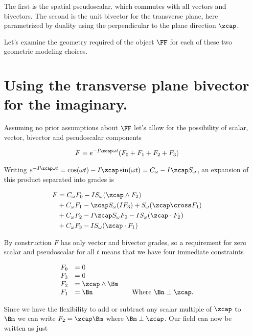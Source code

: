 The first is the spatial pseudoscalar, which commutes with all vectors and bivectors.  The second is the unit bivector for the transverse plane, here parametrized by duality using the perpendicular to the plane direction $\zcap$.

Let's examine the geometry required of the object $\FF$ for each of these two geometric modeling choices.

\section{Using the transverse plane bivector for the imaginary.}

Assuming no prior assumptions about $\FF$ let's allow for the possibility of scalar, vector, bivector and pseudoscalar components 

\begin{align}\label{eqn:foo5}
F = e^{-I\zcap \omega t} ( F_0 + F_1 + F_2 + F_3 )
\end{align}

Writing $e^{-I\zcap \omega t} = \cos(\omega t) -I \zcap \sin(\omega t) = C_\omega -I \zcap S_\omega$, an expansion of this product separated into grades is

\begin{align*}
F &= 
  C_\omega F_0 - I S_\omega (\zcap \wedge F_2) \\
&+ C_\omega F_1 - \zcap S_\omega (I F_3) + S_\omega (\zcap \cross F_1)  \\
&+ C_\omega F_2 - I \zcap S_\omega F_0 - I S_\omega (\zcap \cdot F_2) \\
&+ C_\omega F_3 - I S_\omega (\zcap \cdot F_1)
\end{align*}

By construction $F$ has only vector and bivector grades, so a requirement for zero scalar and pseudoscalar for all $t$ means that we have four immediate constraints

\begin{align*}
\begin{array}{l l l}
F_0 &= 0 & \\
F_3 &= 0 & \\
F_2 &= \zcap \wedge \Bm \\
F_1 &= \Bn & \quad \mbox{Where $\Bn \perp \zcap$.} \\
\end{array}
\end{align*}

Since we have the flexibility to add or subtract any scalar multiple of $\zcap$ to $\Bm$ we can write $F_2 = \zcap \Bm$ where $\Bm \perp \zcap$.  Our field can now be written as just

